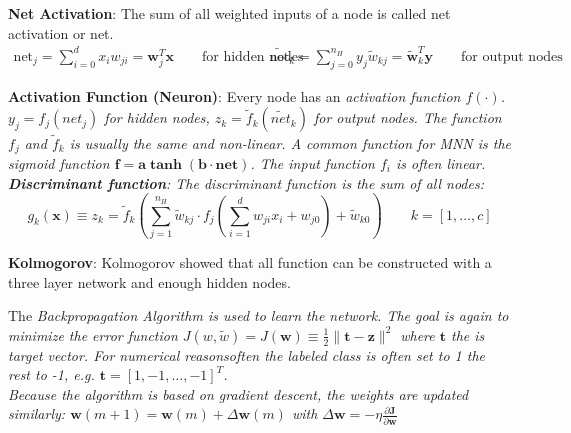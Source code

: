   \textbf{Net Activation}: The sum of all weighted inputs of a node is called net activation or net. 
  \begin{align*}
      \mathrm{net}_j = \sum\limits_{i=0}^d x_i w_{ji} = \bm w_j^T\bm x \qquad\text{for hidden nodes} &&
      \tilde{\mathrm{net}}_k = \sum\limits_{j=0}^{n_H} y_j \tilde{w}_{kj} = \bm{ \tilde{w}}_k^T\bm y  \qquad\text{for output nodes}
  \end{align*}

  \textbf{Activation Function (Neuron)}: Every node has an \em activation function $f(\cdot)$\em. 
  $y_j=f_j(net_j)$ for hidden nodes, $z_k=\tilde f_k(\tilde{net}_k)$ for output nodes.  
  The function $f_j$ and $\tilde f_k$ is usually the same and non-linear. 
  A common function for MNN is the sigmoid function $\bm{f=a \tanh(b \cdot net)}$.
  The input function $f_i$ is often linear. \\
  
  \textbf{Discriminant function}: The \em discriminant function \em is the sum of all nodes:
  $$ g_k(\bm x) \equiv z_k = \tilde f_k\left( \sum\limits_{j=1}^{n_H} \tilde{w}_{kj} \cdot f_j 
    \left( \sum\limits_{i=1}^d w_{ji} x_i +w_{j0} \right)+ \tilde{w}_{k0} \right) \qquad k=[1,\ldots,c]$$ 
  
  \textbf{Kolmogorov}: Kolmogorov showed that all function can be constructed with a three layer network and enough hidden nodes.
  
 The \em Backpropagation Algorithm \em is used to learn the network.
 The goal is again to minimize the error function $J( w, \tilde{w})=J(\bm w)\equiv \frac{1}{2}\| \bm t - \bm z \|^2 $ where $\bm t$ the is target vector. For numerical 
 reasonsoften the labeled class is often set to 1 the rest to -1, e.g. $\bm t =[1,-1,\ldots,-1]^T$. \\
 Because the algorithm is based on gradient descent, the weights are updated similarly:
 $\bm w(m+1)=\bm w(m)+\Delta \bm w(m)$ with $\Delta \bm w = -\eta \frac{\partial \bm J}{\partial \bm w}$\\
